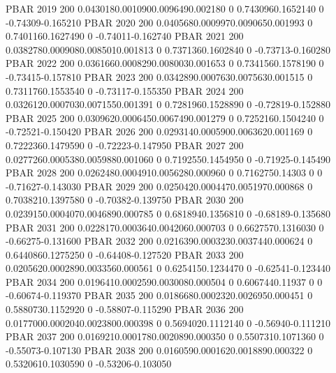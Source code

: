 PBAR    2019    200     0.0430180.0010900.0096490.002180
        0       0.7430960.1652140       0       -0.74309-0.165210       
PBAR    2020    200     0.0405680.0009970.0090650.001993
        0       0.7401160.1627490       0       -0.74011-0.162740       
PBAR    2021    200     0.0382780.0009080.0085010.001813
        0       0.7371360.1602840       0       -0.73713-0.160280       
PBAR    2022    200     0.0361660.0008290.0080030.001653
        0       0.7341560.1578190       0       -0.73415-0.157810       
PBAR    2023    200     0.0342890.0007630.0075630.001515
        0       0.7311760.1553540       0       -0.73117-0.155350       
PBAR    2024    200     0.0326120.0007030.0071550.001391
        0       0.7281960.1528890       0       -0.72819-0.152880       
PBAR    2025    200     0.0309620.0006450.0067490.001279
        0       0.7252160.1504240       0       -0.72521-0.150420       
PBAR    2026    200     0.0293140.0005900.0063620.001169
        0       0.7222360.1479590       0       -0.72223-0.147950       
PBAR    2027    200     0.0277260.0005380.0059880.001060
        0       0.7192550.1454950       0       -0.71925-0.145490       
PBAR    2028    200     0.0262480.0004910.0056280.000960
        0       0.7162750.14303 0       0       -0.71627-0.143030       
PBAR    2029    200     0.0250420.0004470.0051970.000868
        0       0.7038210.1397580       0       -0.70382-0.139750       
PBAR    2030    200     0.0239150.0004070.0046890.000785
        0       0.6818940.1356810       0       -0.68189-0.135680       
PBAR    2031    200     0.0228170.0003640.0042060.000703
        0       0.6627570.1316030       0       -0.66275-0.131600       
PBAR    2032    200     0.0216390.0003230.0037440.000624
        0       0.6440860.1275250       0       -0.64408-0.127520       
PBAR    2033    200     0.0205620.0002890.0033560.000561
        0       0.6254150.1234470       0       -0.62541-0.123440       
PBAR    2034    200     0.0196410.0002590.0030080.000504
        0       0.6067440.11937 0       0       -0.60674-0.119370       
PBAR    2035    200     0.0186680.0002320.0026950.000451
        0       0.5880730.1152920       0       -0.58807-0.115290       
PBAR    2036    200     0.0177000.0002040.0023800.000398
        0       0.5694020.1112140       0       -0.56940-0.111210       
PBAR    2037    200     0.0169210.0001780.0020890.000350
        0       0.5507310.1071360       0       -0.55073-0.107130       
PBAR    2038    200     0.0160590.0001620.0018890.000322
        0       0.5320610.1030590       0       -0.53206-0.103050       
